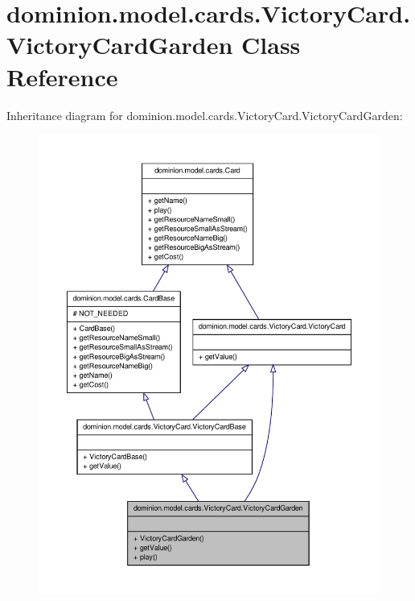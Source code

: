 \hypertarget{classdominion_1_1model_1_1cards_1_1VictoryCard_1_1VictoryCardGarden}{\section{dominion.\-model.\-cards.\-Victory\-Card.\-Victory\-Card\-Garden \-Class \-Reference}
\label{classdominion_1_1model_1_1cards_1_1VictoryCard_1_1VictoryCardGarden}
}


\-Inheritance diagram for dominion.\-model.\-cards.\-Victory\-Card.\-Victory\-Card\-Garden\-:
\nopagebreak
\begin{figure}[H]
\begin{center}
\leavevmode
\includegraphics[width=350pt]{classdominion_1_1model_1_1cards_1_1VictoryCard_1_1VictoryCardGarden__inherit__graph}
\end{center}
\end{figure}


